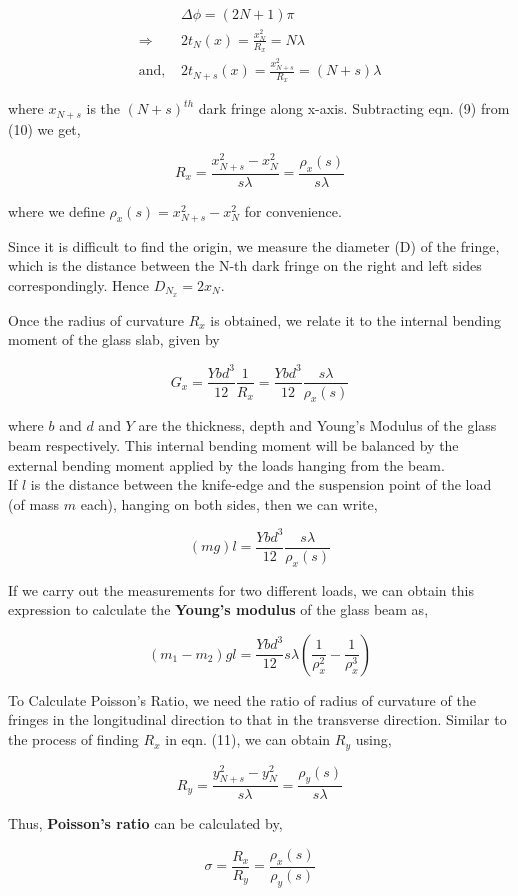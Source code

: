 \begin{align}
    & \Delta \phi = (2N + 1)\pi \\
     \Rightarrow & 2t_N(x) = \frac{x_N^2}{R_x}=N\lambda \\
    \text{and, } & 2t_{N+s}(x) = \frac{x_{N+s}^2}{R_x}=(N+s)\lambda
\end{align}

where $x_{N+s}$ is the $(N+s)^{th}$ dark fringe along x-axis. Subtracting eqn. (9) from (10) we get,

\begin{equation}
    R_x =  \frac{x_{N+s}^2 - x_N^2}{s\lambda} = \frac{\rho_x(s)}{s\lambda}
\end{equation}

where we define $\rho_x(s) = x_{N+s}^2 - x_N^2$ for convenience.

Since it is difficult to find the origin, we measure the diameter (D) of the fringe, which is the distance between the N-th dark fringe on the right and left sides correspondingly. Hence $D_{N_x} = 2x_N$.

Once the radius of curvature $R_x$ is obtained, we relate it to the internal bending moment of the glass slab, given by

\begin{equation}
    G_x = \frac{Ybd^3}{12}\frac{1}{R_x} = \frac{Ybd^3}{12}\frac{s\lambda}{\rho_x(s)}
\end{equation}

where $b$ and $d$ and $Y$ are the thickness, depth and Young's Modulus of the glass beam respectively. This internal bending moment will be balanced by the external bending moment applied by the loads hanging from the beam.\\
If $l$ is the distance between the knife-edge and the suspension point of the load (of mass $m$ each), hanging on both sides, then we can write,

\begin{equation}
    (mg)l = \frac{Ybd^3}{12}\frac{s\lambda}{\rho_x(s)}
\end{equation}

If we carry out the measurements for two different loads, we can obtain this expression to calculate the  \textbf{Young's modulus} of the glass beam as,

\begin{equation}
    (m_1 - m_2)gl = \frac{Ybd^3}{12}s\lambda\left(\frac{1}{\rho_{x}^2}-\frac{1}{\rho_{x}^3}\right)
\end{equation}

To Calculate Poisson's Ratio, we need the ratio of radius of curvature of the fringes in the longitudinal direction to that in the transverse direction. Similar to the process of finding $R_x$ in eqn. (11), we can obtain $R_y$ using,

\begin{equation}
    R_y =  \frac{y_{N+s}^2 - y_N^2}{s\lambda} = \frac{\rho_y(s)}{s\lambda}
\end{equation}

Thus, \textbf{Poisson's ratio} can be calculated by,

\begin{equation}
    \sigma =  \frac{R_x}{R_y} = \frac{\rho_x(s)}{\rho_y(s)}
\end{equation}
